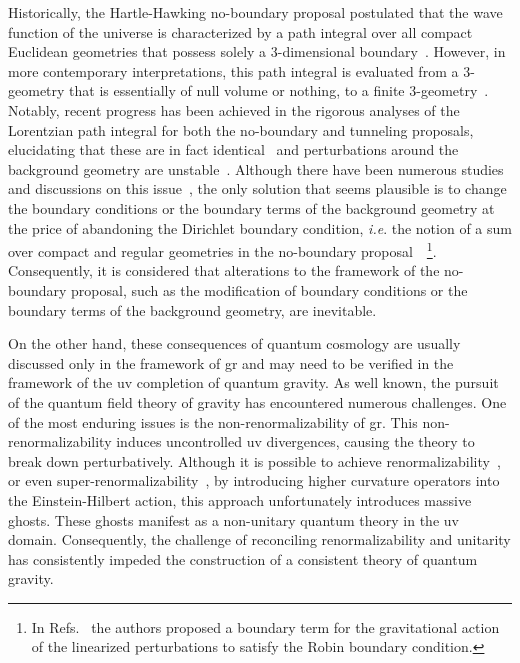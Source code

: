 \documentclass[superscriptaddress,aps,preprintnumbers,nofootinbib]{revtex4-2}
\begin{document}
Historically, the Hartle-Hawking no-boundary proposal postulated that the wave function of the universe is characterized by a path integral over all compact Euclidean geometries that possess solely a $3$-dimensional boundary~\cite{Hartle:1983ai}. However, in more contemporary interpretations, this path integral is evaluated from a $3$-geometry that is essentially of null volume or nothing, to a finite $3$-geometry~\cite{Halliwell:1988ik}. Notably, recent progress has been achieved in the rigorous analyses of the Lorentzian path integral for both the no-boundary and tunneling proposals, elucidating that these are in fact identical~\cite{Feldbrugge:2017kzv} and perturbations around the background geometry are unstable~\cite{Feldbrugge:2017fcc,Feldbrugge:2017mbc}. Although there have been numerous studies and discussions on this issue~\cite{Feldbrugge:2017fcc, DiazDorronsoro:2017hti, Feldbrugge:2017mbc, Feldbrugge:2018gin, DiazDorronsoro:2018wro,Halliwell:2018ejl,Janssen:2019sex, Vilenkin:2018dch, Vilenkin:2018oja, Bojowald:2018gdt, DiTucci:2018fdg, DiTucci:2019dji, DiTucci:2019bui, Lehners:2021jmv,Matsui:2021yte,Martens:2022dtd,Matsui:2022lfj}, the only solution that seems plausible is to change the boundary conditions or the boundary terms of the background geometry at the price of abandoning the Dirichlet boundary condition, \textit{i.e}. the notion of a sum over compact and regular geometries in the no-boundary proposal~\cite{DiTucci:2019dji,DiTucci:2019bui}~\footnote{In Refs.~\cite{Vilenkin:2018dch,Vilenkin:2018oja} the authors proposed a boundary term for the gravitational action of the linearized perturbations to satisfy the Robin boundary condition.}. Consequently, it is considered that alterations to the framework of the no-boundary proposal, such as the modification of boundary conditions or the boundary terms of the background geometry, are inevitable. 



On the other hand, these consequences of quantum cosmology are usually discussed only in the framework of \ac{gr} and may need to be verified in the framework of the \ac{uv} completion of quantum gravity. As well known, the pursuit of the quantum field theory of gravity has encountered numerous challenges. One of the most enduring issues is the non-renormalizability of \ac{gr}. This non-renormalizability induces uncontrolled \ac{uv} divergences, causing the theory to break down perturbatively. Although it is possible to achieve renormalizability~\cite{Stelle:1976gc}, or even super-renormalizability~\cite{Asorey:1996hz}, by introducing higher curvature operators into the Einstein-Hilbert action, this approach unfortunately introduces massive ghosts. These ghosts manifest as a non-unitary quantum theory in the \ac{uv} domain. Consequently, the challenge of reconciling renormalizability and unitarity has consistently impeded the construction of a consistent theory of quantum gravity.
\end{document}
